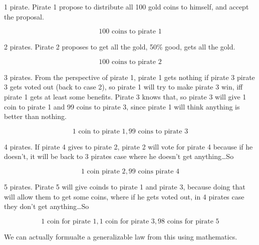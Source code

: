 \documentclass[
  letterpaper,
  DIV=11,
  numbers=noendperiod]{scrreprt}
\begin{document}
1 pirate. Pirate 1 propose to distribute all 100 gold coins to himself,
and accept the proposal.

\[100 \text{ coins to pirate 1}\]

2 pirates. Pirate 2 proposes to get all the gold, 50\% good, gets all
the gold.

\[100 \text{ coins to pirate 2}\]

3 pirates. From the perspective of pirate 1, pirate 1 gets nothing if
pirate 3 pirate 3 gets voted out (back to case 2), so pirate 1 will try
to make pirate 3 win, iff pirate 1 gets at least some benefits. Pirate 3
knows that, so pirate 3 will give 1 coin to pirate 1 and 99 coins to
pirate 3, since pirate 1 will think anything is better than nothing.

\[1 \text{ coin to pirate 1}, 99 \text{ coins to pirate 3}\]

4 pirates. If pirate 4 gives to pirate 2, pirate 2 will vote for pirate
4 because if he doesn't, it will be back to 3 pirates case where he
doesn't get anything\ldots So

\[1 \text{ coin pirate 2}, 99 \text{ coins pirate 4}\]

5 pirates. Pirate 5 will give coinds to pirate 1 and pirate 3, because
doing that will allow them to get some coins, where if he gets voted
out, in 4 pirates case they don't get anything\ldots So

\[\boxed{1 \text{ coin for pirate 1}, 1 \text{ coin for pirate 3}, 98 \text{ coins for pirate 5}}\]

We can actually formualte a generalizable law from this using
mathematics.
\end{document}
